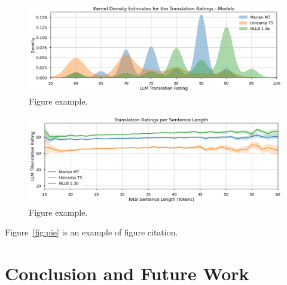 \documentclass{article}
\begin{document}
\begin{figure}[htbp]
    \centering
    \includegraphics[width=1\textwidth]{figures/kde.png}
    \caption{\label{fig:kde}Figure example.}
\end{figure}

\begin{figure}[htpb]
    \centering
    \includegraphics[width=1\textwidth]{figures/line-chart.png}
    \caption{\label{fig:line-chart}Figure example.}
\end{figure}

Figure~\ref{fig:pie} is an example of figure citation.

\section{Conclusion and Future Work}



\end{document}
